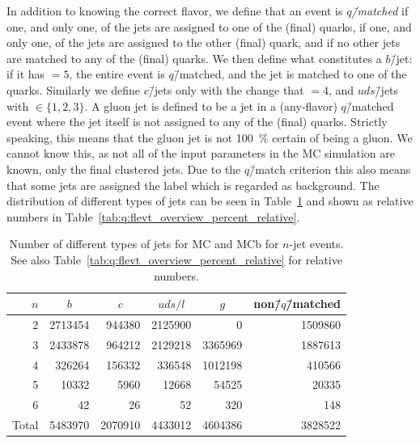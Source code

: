 In addition to knowing the correct flavor, we define that an event is \emph{$q$\=/matched} if one, and only one, of the jets are assigned to one of the (final) quarks, if one, and only one, of the jets are assigned to the other (final) quark, and if no other jets are matched to any of the (final) quarks. We then define what constitutes a $b$\=/jet: if it has  $= 5$, the entire event is $q$\=/matched, and the jet is matched to one of the quarks. Similarly we define $c$\=/jets only with the change that  $= 4$, and $uds$\=/jets with  $\in \{1, 2, 3\}$. A gluon jet is defined to be a jet in a (any-flavor) $q$\=/matched event where the jet itself is not assigned to any of the (final) quarks. Strictly speaking, this means that the gluon jet is not \SI{100}{\percent} certain of being a gluon. We cannot know this, as not all of the input parameters in the MC simulation are known, only the final clustered jets. Due to the $q$\=/match criterion this also means that some jets are assigned the label  which is regarded as background. The distribution of different types of jets can be seen in Table~\ref{tab:q:flevt_overview} and shown as relative numbers in Table~\ref{tab:q:flevt_overview_percent_relative}.
\vspace{-2mm}
\begin{table}[h!]
  \centering
  \begin{tabular}{@{}rrrrrr@{}}
    $n$    & \multicolumn{1}{c}{$b$} & \multicolumn{1}{c}{$c$} & \multicolumn{1}{c}{$uds / l$} & \multicolumn{1}{c}{$g$} & non\=/$q$\=/matched    \\ 
    \midrule
    \num{2}     & \num{2713454} &  \num{944380} & \num{2125900} &       \num{0} & \num{1509860} \\
    \num{3}     & \num{2433878} &  \num{964212} & \num{2129218} & \num{3365969} & \num{1887613} \\
    \num{4}     &  \num{326264} &  \num{156332} &  \num{336548} & \num{1012198} &  \num{410566} \\
    \num{5}     &   \num{10332} &    \num{5960} &   \num{12668} &   \num{54525} &   \num{20335} \\
    \num{6}     &      \num{42} &      \num{26} &      \num{52} &     \num{320} &     \num{148} \\
    \midrule
    Total & \num{5483970} & \num{2070910} & \num{4433012} & \num{4604386} & \num{3828522} \\
  \end{tabular}
  \caption[Number of Different Types of Jets for MC and MCb for $n$-Jet Events]{Number of different types of jets for MC and MCb for $n$-jet events. See also Table~\ref{tab:q:flevt_overview_percent_relative} for relative numbers.}
  \label{tab:q:flevt_overview}
\end{table}
\vspace{-5mm}

